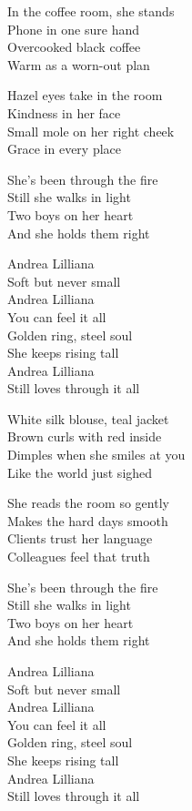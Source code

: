 \begin{lyrics}

In the coffee room, she stands\\
Phone in one sure hand\\
Overcooked black coffee\\
Warm as a worn-out plan

Hazel eyes take in the room\\
Kindness in her face\\
Small mole on her right cheek\\
Grace in every place

She’s been through the fire\\
Still she walks in light\\
Two boys on her heart\\
And she holds them right

Andrea Lilliana\\
Soft but never small\\
Andrea Lilliana\\
You can feel it all\\
Golden ring, steel soul\\
She keeps rising tall\\
Andrea Lilliana\\
Still loves through it all

White silk blouse, teal jacket\\
Brown curls with red inside\\
Dimples when she smiles at you\\
Like the world just sighed

She reads the room so gently\\
Makes the hard days smooth\\
Clients trust her language\\
Colleagues feel that truth

She’s been through the fire\\
Still she walks in light\\
Two boys on her heart\\
And she holds them right

Andrea Lilliana\\
Soft but never small\\
Andrea Lilliana\\
You can feel it all\\
Golden ring, steel soul\\
She keeps rising tall\\
Andrea Lilliana\\
Still loves through it all


\end{lyrics}

